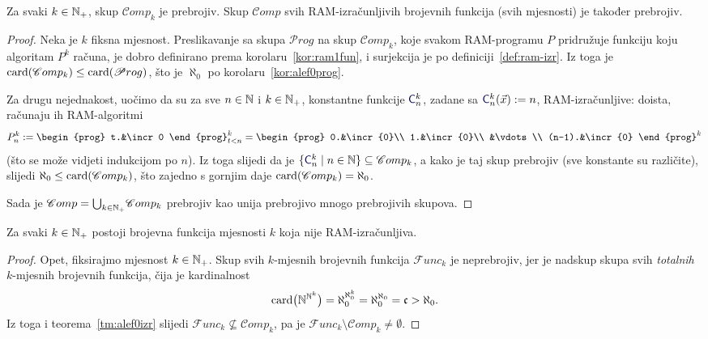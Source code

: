 \begin{teorem}[{name=[prebrojivost skupa $\mathscr Comp$]}]\label{tm:alef0izr}
Za svaki $k\in{\mathbb N}_+$, skup $\mathscr Comp_k$ je prebrojiv. Skup $\mathscr Comp$ svih RAM-izračunljivih brojevnih funkcija (svih mjesnosti) je također prebrojiv.
\end{teorem}
\begin{proof}
Neka je $k$ fiksna mjesnost. Preslikavanje
sa skupa $\mathscr Prog$ na skup $\mathscr Comp_k$,
    koje svakom RAM-programu $P$ pridružuje funkciju koju algoritam $P^k$ računa, je dobro definirano prema korolaru~\ref{kor:ram1fun}, i surjekcija je po definiciji~\ref{def:ram-izr}. Iz toga je $\operatorname{card}(\mathscr Comp_k)\le\operatorname{card}(\mathscr Prog)$, što je $\aleph_0$ po korolaru~\ref{kor:alef0prog}.

Za drugu nejednakost, uočimo da su za sve $n\in{\mathbb N}$ i $k\in{\mathbb N}_+$, konstantne funkcije $\f{C}_n^k$, zadane sa
$\f{C}_n^k(\vec x):=n$, RAM-izračunljive: doista, računaju ih RAM-algoritmi
\begin{equation}\label{eq:konstRAM}
    P_n^k:=\begin{prog}
    t.&\incr0
    \end{prog}_{t<n}^k=\begin{prog}
    0.&\incr{0}\\
    1.&\incr{0}\\
    &\vdots\\
    (n-1).&\incr{0}
    \end{prog}^k
\end{equation}
(što se može vidjeti indukcijom po $n$).
Iz toga slijedi da je $\{\f{C}_n^k\mid n\in\N\}\subseteq\mathscr Comp_k$, a kako je taj skup prebrojiv (sve konstante su različite), slijedi $\aleph_0\le\operatorname{card}(\mathscr Comp_k)$, što zajedno s gornjim daje $\operatorname{card}(\mathscr Comp_k)=\aleph_0$.

Sada je $\mathscr Comp=\bigcup_{k\in{\mathbb N}_+}\!\mathscr Comp_k$ prebrojiv kao unija prebrojivo mnogo prebrojivih skupova.
\end{proof}

\begin{korolar}[{name=[postojanje ne-RAM-izračunljivih funkcija]}]\label{kor:exneizrk}
Za svaki $k\in{\mathbb N}_+$ postoji brojevna funkcija mjesnosti $k$ koja nije RAM-izračunljiva.
\end{korolar}
\begin{proof}
Opet, fiksirajmo mjesnost $k\in{\mathbb N}_+$. Skup svih $k$-mjesnih brojevnih funkcija $\mathscr Func_k$ je neprebrojiv, jer je nadskup skupa svih \emph{totalnih} $k$-mjesnih brojevnih funkcija, čija je kardinalnost
\begin{equation}
    \operatorname{card}\bigl({\mathbb N}^{{\mathbb N}^k}\bigr)=\aleph_0^{\aleph_0^k}=\aleph_0^{\aleph_0}=\mathfrak c>\aleph_0\text.
\end{equation}
    Iz toga i teorema~\ref{tm:alef0izr} slijedi $\mathscr Func_k\nsubseteq\mathscr Comp_k$, pa je $\mathscr Func_k\setminus\mathscr Comp_k\ne\emptyset$.
\end{proof}

